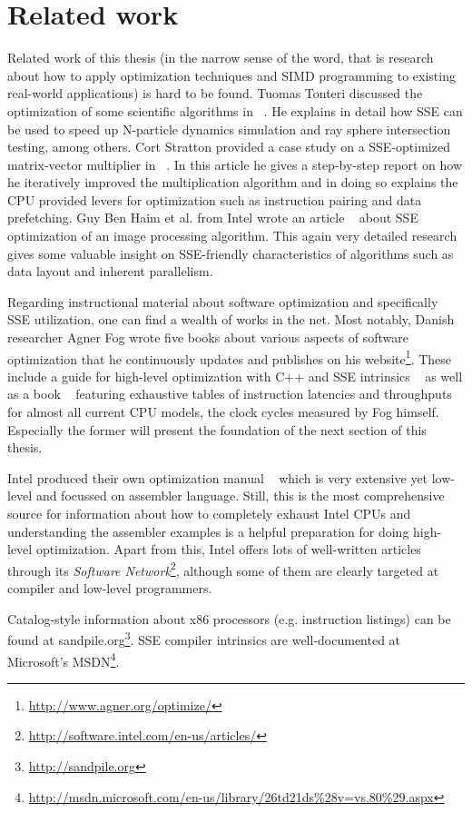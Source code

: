 \section{Related work}
\label{Related_work}

Related work of this thesis (in the narrow sense of the word, that is research about how to apply optimization techniques and SIMD programming to existing real-world applications) is hard to be found. Tuomas Tonteri discussed the optimization of some scientific algorithms in ~\cite{tonteri2012}. He explains in detail how SSE can be used to speed up N-particle dynamics simulation and ray sphere intersection testing, among others. Cort Stratton provided a case study on a SSE-optimized matrix-vector multiplier in ~\cite{stratton2002}. In this article he gives a step-by-step report on how he iteratively improved the multiplication algorithm and in doing so explains the CPU provided levers for optimization such as instruction pairing and data prefetching. Guy Ben Haim et al. from Intel wrote an article ~\cite{haim2009} about SSE optimization of an image processing algorithm. This again very detailed research gives some valuable insight on SSE-friendly characteristics of algorithms such as data layout and inherent parallelism.

Regarding instructional material about software optimization and specifically SSE utilization, one can find a wealth of works in the net. Most notably, Danish researcher Agner Fog wrote five books about various aspects of software optimization that he continuously updates and publishes on his website\footnote{\url{http://www.agner.org/optimize/}}. These include a guide for high-level optimization with C++ and SSE intrinsics ~\cite{fog2011optimizing} as well as a book ~\cite{fog2011instructiontables} featuring exhaustive tables of instruction latencies and throughputs for almost all current CPU models, the clock cycles measured by Fog himself. Especially the former will present the foundation of the next section of this thesis.

Intel produced their own optimization manual ~\cite{intel2011manual} which is very extensive yet low-level and focussed on assembler language. Still, this is the most comprehensive source for information about how to completely exhaust Intel CPUs and understanding the assembler examples is a helpful preparation for doing high-level optimization. Apart from this, Intel offers lots of well-written articles through its \emph{Software Network}\footnote{\url{http://software.intel.com/en-us/articles/}}, although some of them are clearly targeted at compiler and low-level programmers.

Catalog-style information about x86 processors (e.g. instruction listings) can be found at sandpile.org\footnote{\url{http://sandpile.org}}. SSE compiler intrinsics are well-documented at Microsoft's MSDN\footnote{\url{http://msdn.microsoft.com/en-us/library/26td21ds\%28v=vs.80\%29.aspx}}.
